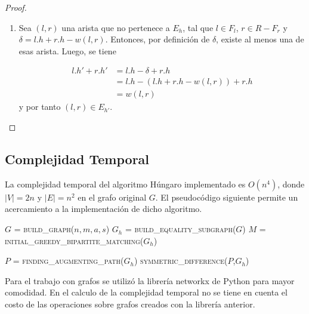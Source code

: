 \documentclass[10pt]{article} %
\begin{document}
\begin{proof}
\begin{enumerate}
		Se conoce que para $l \in F_l$ y $r \in F_r$ se cumple $l.h' + r.h' = l.h + r.h$. En caso contrario, cuando $l \in L-F_l$ y $r \in R-F_r$, se tiene que $l.h' = l.h$ y $r.h'=r.h$, entonces $l.h' + r.h' = l.h + r.h$. Por tanto, si la arista $(l,r)$ est\'a en el emparejamiento $M$ para el grafo $G_h$, entonces $(l,r) \in E_{h'}$.
		\item Sea $(l,r)$ una arista que no pertenece a $E_h$, tal que $l \in F_l$, $r \in R-F_r$ y $\delta = l.h + r.h - w(l,r)$. Entonces, por definici\'on de $\delta$, existe al menos una de esas arista. Luego, se tiene 
		
		\begin{align*}
			l.h' + r.h' &= l.h - \delta + r.h\\
			&= l.h - (l.h + r.h -w(l,r)) + r.h\\
			&= w(l,r)			
		\end{align*}
		y por tanto $(l,r) \in E_{h'}$. 
		
		
	\end{enumerate}
	
\end{proof}


\subsection{Complejidad Temporal}

La complejidad temporal del algoritmo H\'ungaro implementado es $O(n^4)$, donde $|V|=2n$ y $|E|=n^2$ en el grafo original $G$. El pseudoc\'odigo siguiente permite un acercamiento a la implementaci\'on de dicho algoritmo.

\vspace{1em}
\begin{algorithmic}[1]
	\State $G$ = \textsc{build\_graph($n, m, a, s$)}
	\State $G_h$ = \textsc{build\_equality\_subgraph($G$})
	\State $M$ =\textsc{ initial\_greedy\_bipartite\_matching($G_h$)}
	
	\State $P$ = \textsc{finding\_augmenting\_path($G_h$)}
	\State \textsc{symmetric\_difference($P$,$G_h$)}
	
	
	\EndWhile
	\EndFunction 
\end{algorithmic}
\vspace{1em}

Para el trabajo con grafos se utiliz\'o la librer\'ia networkx de Python para mayor comodidad. En el calculo de la complejidad temporal no se tiene en cuenta el costo de las operaciones sobre grafos creados con la librer\'ia anterior.
\end{document}

